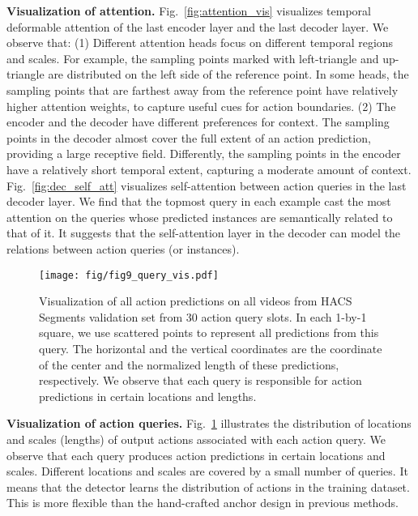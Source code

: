 \documentclass[lettersize,journal]{IEEEtran}
\begin{document}
\noindent\textbf{Visualization of attention.}  Fig.~\ref{fig:attention_vis} visualizes temporal deformable attention of the last encoder layer and the last decoder layer. 
We observe that:
(1) Different attention heads focus on different temporal regions and scales. For example, the sampling points marked with left-triangle and up-triangle are distributed on the left side of the reference point. 
In some heads, the sampling points that are farthest away from the reference point have relatively higher attention weights, to capture useful cues for action boundaries.
(2) The encoder and the decoder have different preferences for context. The sampling points in the decoder almost cover the full extent of an action prediction, providing a large receptive field. Differently, the sampling points in the encoder have a relatively short temporal extent, capturing a moderate amount of context.
Fig.~\ref{fig:dec_self_att} visualizes self-attention between action queries in the last decoder layer. We find that the topmost query in each example cast the most attention on the queries whose predicted instances are semantically related to that of it. It suggests that the self-attention layer in the decoder can model the relations between action queries (or instances).

\begin{figure}[tb]
\centering
\texttt{[image: fig/fig9\_query\_vis.pdf]}
\caption{Visualization of all action predictions on all videos from HACS Segments validation set from 30 action query slots.
In each 1-by-1 square, we use scattered points to represent all predictions from this query. The horizontal and the vertical coordinates are the coordinate of the center and the normalized length of these predictions, respectively. We observe that each query is responsible for action predictions in certain locations and lengths. 
}
\label{fig:slots}
\end{figure}

\vspace{1ex}\noindent\textbf{Visualization of action queries.} Fig.~\ref{fig:slots} illustrates the distribution of locations and scales (lengths) of output actions associated with each action query. We observe that each query produces action predictions in certain locations and scales. Different locations and scales are covered by a small number of queries. It means that the detector learns the distribution of actions in the training dataset. This is more flexible than the hand-crafted anchor design in previous methods.
\end{document}
